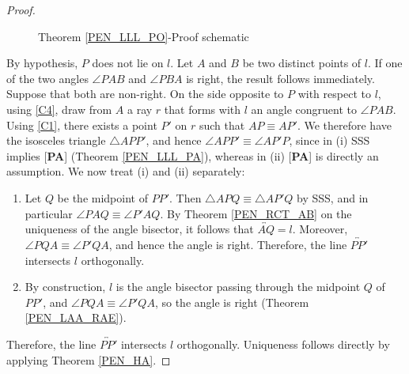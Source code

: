 \documentclass[11pt,a4paper]{article}
\theoremstyle{definition}
\theoremstyle{remark}
\numberwithin{equation}{section}
\begin{document}
\begin{proof}
\begin{figure}[ht!]
\centering
{}
\caption{Theorem \ref{PEN_LLL_PO}-Proof schematic}
\label{PEN_LLL_PO_f}
\end{figure}
By hypothesis, $P$ does not lie on $l$. Let $A$ and $B$ be two distinct points of $l$. If one of the two angles $\angle PAB$ and  $\angle PBA$ is right, the result follows immediately. Suppose that both are non-right. On the side opposite to $P$ with respect to $l$, using \ref{C4}, draw from $A$ a ray $r$ that forms with $l$ an angle congruent to $\angle PAB$. Using \ref{C1}, there exists a point $P'$ on $r$ such that $AP\equiv AP'$. We therefore have the isosceles triangle $\triangle APP'$, and hence $\angle APP'\equiv\angle AP'P$, since in (i) SSS implies [\textbf{PA}] (Theorem \ref{PEN_LLL_PA}), whereas in (ii) [\textbf{PA}] is directly an assumption. We now treat (i) and (ii) separately:
\begin{enumerate}[label=(\roman*)]
\item Let $Q$ be the midpoint of $PP'$. Then $\triangle APQ\equiv \triangle AP'Q$ by SSS, and in particular $\angle PAQ\equiv \angle P'AQ$. By Theorem \ref{PEN_RCT_AB} on the uniqueness of the angle bisector, it follows that $\overleftrightarrow{AQ}=l$. Moreover, $\angle PQA\equiv \angle P'QA$, and hence the angle is right. Therefore, the line $\overleftrightarrow{PP'}$ intersects $l$ orthogonally.
\item By construction, $l$ is the angle bisector passing through the midpoint $Q$ of $PP'$, and $\angle PQA\equiv \angle P'QA$, so the angle is right (Theorem \ref{PEN_LAA_RAE}).
\end{enumerate}
Therefore, the line $\overleftrightarrow{PP'}$ intersects $l$ orthogonally. Uniqueness follows directly by applying Theorem \ref{PEN_HA}.
\end{proof}
\end{document}
